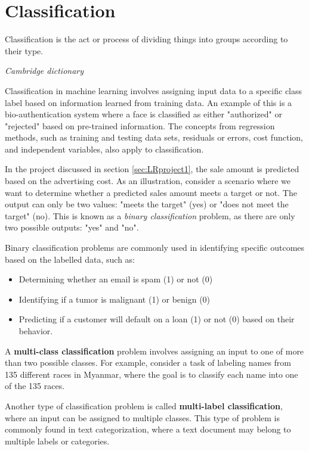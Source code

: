 \chapter{Classification}

\epigraph{Classification is the act or process of dividing things into groups according to their type. }{\textit{Cambridge dictionary}}

Classification in machine learning involves assigning input data to a specific class label based on information learned from training data. An example of this is a bio-authentication system where a face is classified as either "authorized" or "rejected" based on pre-trained information. The concepts from regression methods, such as training and testing data sets, residuals or errors, cost function, and independent variables, also apply to classification.

In the project discussed in section \ref{sec:LRproject1}, the sale amount is predicted based on the advertising cost. As an illustration, consider a scenario where we want to determine whether a predicted sales amount meets a target or not. The output can only be two values: "meets the target" (yes) or "does not meet the target" (no). This is known as a \emph{binary classification} problem, as there are only two possible outputs: "yes" and "no".


Binary classification problems are commonly used in identifying specific outcomes based on the labelled data, such as:
\begin{itemize}
  \item Determining whether an email is spam (1) or not (0)
  \item Identifying if a tumor is malignant (1) or benign (0)
  \item Predicting if a customer will default on a loan (1) or not (0) based on their behavior.
\end{itemize}


A \textbf{multi-class classification} problem involves assigning an input to one of more than two possible classes. For example, consider a task of labeling names from 135 different races in Myanmar, where the goal is to classify each name into one of the 135 races.

Another type of classification problem is called \textbf{multi-label classification}, where an input can be assigned to multiple classes. This type of problem is commonly found in text categorization, where a text document may belong to multiple labels or categories.

